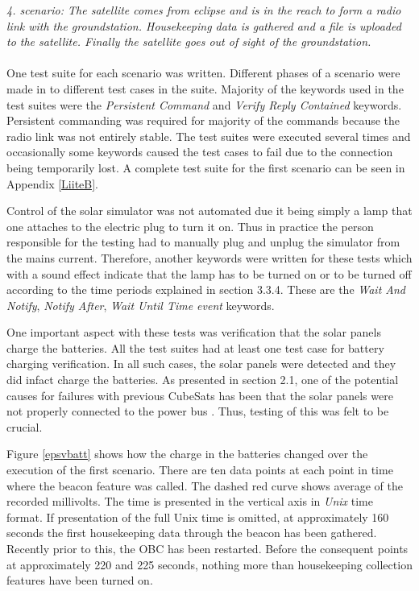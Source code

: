 \documentclass[english,12pt,a4paper,pdftex,elec,utf8]{aaltothesis}
\begin{document}
\textit{4. scenario: The satellite comes from eclipse and is in the reach to form a radio link with the groundstation. Housekeeping data is gathered and a file is uploaded to the satellite. Finally the satellite goes out of sight of the groundstation.}\\
\\
One test suite for each scenario was written. Different phases of a scenario were made in to different test cases in the suite. Majority of the keywords used in the test suites were the \textit{Persistent Command} and \textit{Verify Reply Contained} keywords. Persistent commanding was required for majority of the commands because the radio link was not entirely stable. The test suites were executed several times and occasionally some keywords caused the test cases to fail due to the connection being temporarily lost. A complete test suite for the first scenario can be seen in Appendix \ref{LiiteB}.\par
Control of the solar simulator was not automated due it being simply a lamp that one attaches to the electric plug to turn it on. Thus in practice the person responsible for the testing had to manually plug and unplug the simulator from the mains current. Therefore, another keywords were written for these tests which with a sound effect indicate that the lamp has to be turned on or to be turned off according to the time periods explained in section 3.3.4. These are the \textit{Wait And Notify}, \textit{Notify After}, \textit{Wait Until Time event} keywords.\par
One important aspect with these tests was verification that the solar panels charge the batteries. All the test suites had at least one test case for battery charging verification. In all such cases, the solar panels were detected and they did infact charge the batteries. As presented in section 2.1, one of the potential causes for failures with previous CubeSats has been that the solar panels were not properly connected to the power bus \cite{Swart1}. Thus, testing of this was felt to be crucial.\par 
Figure \ref{epsvbatt} shows how the charge in the batteries changed over the execution of the first scenario. There are ten data points at each point in time where the beacon feature was called. The dashed red curve shows average of the recorded millivolts. The time is presented in the vertical axis in \textit{Unix} time format. If presentation of the full Unix time is omitted, at approximately 160 seconds the first housekeeping data through the beacon has been gathered. Recently prior to this, the OBC has been restarted. Before the consequent points at approximately 220 and 225 seconds, nothing more than housekeeping collection features have been turned on.\par
\end{document}
